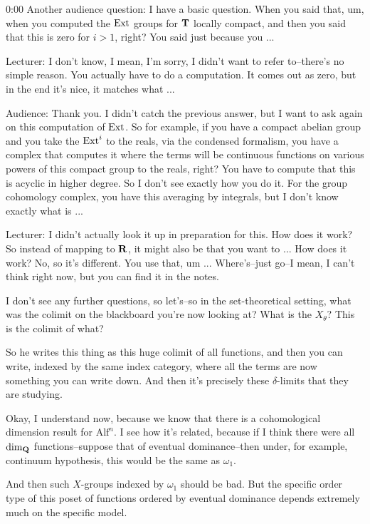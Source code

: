 \begin{unfinished}{0:00}
Another audience question: I have a basic question. When you said that, um, when you computed the $\operatorname{Ext}$ groups for $\mathbf T$ locally compact, and then you said that this is zero for $i > 1$, right? You said just because you ...

Lecturer: I don't know, I mean, I'm sorry, I didn't want to refer to--there's no simple reason. You actually have to do a computation. It comes out as zero, but in the end it's nice, it matches what ...

Audience: Thank you. I didn't catch the previous answer, but I want to ask again on this computation of $\operatorname{Ext}$. So for example, if you have a compact abelian group and you take the $\operatorname{Ext}^i$ to the reals, via the condensed formalism, you have a complex that computes it where the terms will be continuous functions on various powers of this compact group to the reals, right? You have to compute that this is acyclic in higher degree. So I don't see exactly how you do it. For the group cohomology complex, you have this averaging by integrals, but I don't know exactly what is ...

Lecturer: I didn't actually look it up in preparation for this. How does it work? So instead of mapping to $\mathbf R$, it might also be that you want to ... How does it work? No, so it's different. You use that, um ...
Where's--just go--I mean, I can't think right now, but you can find it in the notes.

I don't see any further questions, so let's--so in the set-theoretical setting, what was the colimit on the blackboard you're now looking at? What is the $X_\theta$? This is the colimit of what?

So he writes this thing as this huge colimit of all functions, and then you can write, indexed by the same index category, where all the terms are now something you can write down. And then it's precisely these $\delta$-limits that they are studying.

Okay, I understand now, because we know that there is a cohomological dimension result for $\mathrm{Alf}^n$. I see how it's related, because if I think there were all $\dim_\mathbf Q$ functions--suppose that of eventual dominance--then under, for example, continuum hypothesis, this would be the same as $\omega_1$.

And then such $X$-groups indexed by $\omega_1$ should be bad. But the specific order type of this poset of functions ordered by eventual dominance depends extremely much on the specific model.

\end{unfinished}